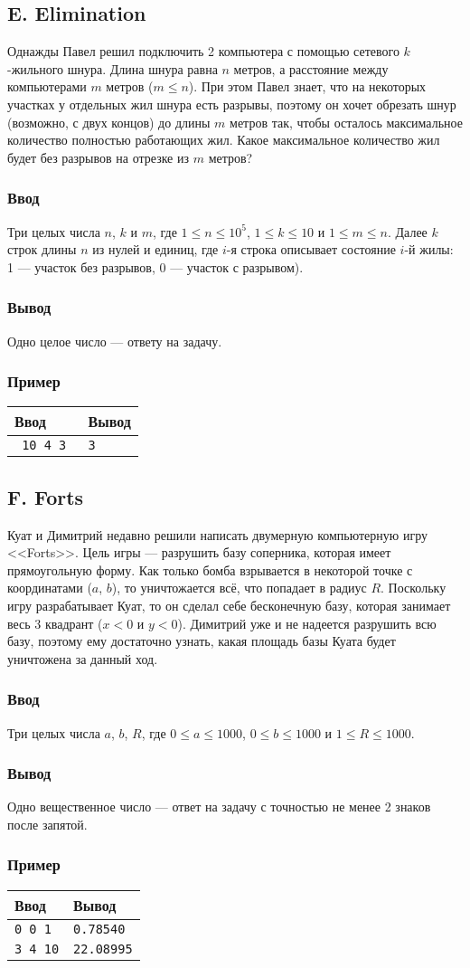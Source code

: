 \documentclass[10pt, a4paper]{article}
\newcommand{\informat}[1]
{
	\subsubsection*{Ввод} #1
}
\newcommand{\outformat}[1]
{
	\subsubsection*{Вывод} #1
}
\newcommand{\example}[2]
{
	\subsubsection*{Пример}
	\noindent
	\begin{center}
	\begin{tabularx}{\linewidth}{|X|X|}
	\hline
	Ввод & Вывод \\
	\hline
	{\tt #1} & {\tt #2}		\\
	\hline
	\end{tabularx}
	\end{center}
}
\newcommand{\examplee}[4]
{
	\subsubsection*{Пример}
	\noindent
	\begin{center}
	\begin{tabularx}{\linewidth}{|X|X|}
	\hline
	Ввод 	& Вывод  	\\
	\hline
	{\tt #1} & {\tt #2}	\\
	\hline
	{\tt #3} & {\tt #4}	\\
	\hline
	\end{tabularx}
	\end{center}
}
\begin{document}
\subsection*{E. Elimination}

Однажды Павел решил подключить 2 компьютера с помощью сетевого $k$-жильного шнура. Длина шнура равна $n$ метров, а расстояние между компьютерами $m$ метров ($m \leqslant n$). При этом Павел знает, что на некоторых участках у отдельных жил шнура есть разрывы, поэтому он хочет обрезать шнур (возможно, с двух концов) до длины $m$ метров так, чтобы осталось максимальное количество полностью работающих жил. Какое максимальное количество жил будет без разрывов на отрезке из $m$ метров?

\informat{Три целых числа $n$, $k$ и $m$, где $1 \leqslant n \leqslant 10^5$,  $1 \leqslant k \leqslant 10$ и $1 \leqslant m \leqslant n$. \newline
Далее $k$ строк длины $n$ из нулей и единиц, где $i$-я строка описывает состояние $i$-й жилы: 1 --- участок без разрывов, 0 --- участок с разрывом).
}

\outformat{Одно целое число --- ответу на задачу.}

\example{
10 4 3 \newline
1110111111 \newline
1011111111 \newline
0011111100 \newline
1111110111}
{3}



\subsection*{F. Forts}

Куат и Димитрий недавно решили написать двумерную компьютерную игру <<Forts>>. Цель игры --- разрушить базу соперника, которая имеет прямоугольную форму. Как только бомба взрывается в некоторой точке с координатами ($a$, $b$), то уничтожается всё, что попадает в радиус $R$. Поскольку игру разрабатывает Куат, то он сделал себе бесконечную базу, которая занимает весь 3 квадрант ($x < 0$ и $y < 0$). Димитрий уже и не надеется разрушить всю базу, поэтому ему достаточно узнать, какая площадь базы Куата будет уничтожена за данный ход.

\informat{Три целых числа $a$, $b$, $R$, где $0 \le a \le 1000$, $0 \le b \le 1000$ и $1 \le R \le 1000$.}

\outformat{Одно вещественное число --- ответ на задачу с точностью не менее 2 знаков после запятой.}

\examplee{0 0 1}{0.78540}{3 4 10}{22.08995}
\end{document}
